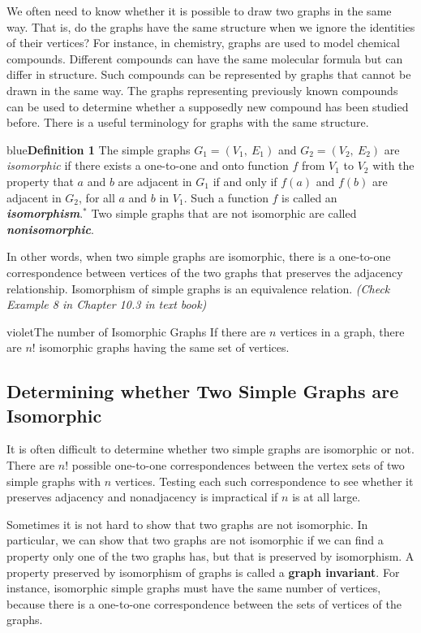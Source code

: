 \documentclass[11pt]{article}
\newenvironment{definition}[1]{\begin{mybox}{blue}{\textbf{Definition #1}}}{\end{mybox}}
\begin{document}
We often need to know whether it is possible to draw two graphs in the same way. That is, do the graphs have the same structure when we ignore the identities of their vertices? For instance, in chemistry, graphs are used to model chemical compounds. Different compounds can have the same molecular formula but can differ in structure. Such compounds can be represented by graphs that cannot be drawn in the same way. The graphs representing previously known compounds can be used to determine whether a supposedly new compound has been studied before. There is a useful terminology for graphs with the same structure.

\begin{definition}{1}
The simple graphs $G_1 = (V_1,\ E_1)$ and $G_2 = (V_2,\ E_2)$ are \textit{isomorphic} if there exists a one-to-one and onto function $f$ from $V_1$ to $V_2$ with the property that $a$ and $b$ are adjacent in $G_1$ if and only if $f(a)$ and $f(b)$ are adjacent in $G_2$, for all $a$ and $b$ in $V_1$. Such a function $f$ is called an \textbf{\textit{isomorphism}}.$^{*}$ Two simple graphs that are not isomorphic are called \textbf{\textit{nonisomorphic}}.
\end{definition}

In other words, when two simple graphs are isomorphic, there is a one-to-one correspondence between vertices of the two graphs that preserves the adjacency relationship. Isomorphism of simple graphs is an equivalence relation. \textit{(Check Example 8 in Chapter 10.3 in text book)}

\begin{mybox}{violet}{The number of Isomorphic Graphs}
If there are $n$ vertices in a graph, there are $n!$ isomorphic graphs having the same set of vertices.
\end{mybox}

\subsection{Determining whether Two Simple Graphs are Isomorphic}

It is often difficult to determine whether two simple graphs are isomorphic or not. There are $n!$ possible one-to-one correspondences between the vertex sets of two simple graphs with $n$ vertices. Testing each such correspondence to see whether it preserves adjacency and nonadjacency is impractical if $n$ is at all large.

Sometimes it is not hard to show that two graphs are not isomorphic. In particular, we can show that two graphs are not isomorphic if we can find a property only one of the two graphs has, but that is preserved by isomorphism. A property preserved by isomorphism of graphs is called a \textbf{graph invariant}. For instance, isomorphic simple graphs must have the same number of vertices, because there is a one-to-one correspondence between the sets of vertices of the graphs.
\end{document}
